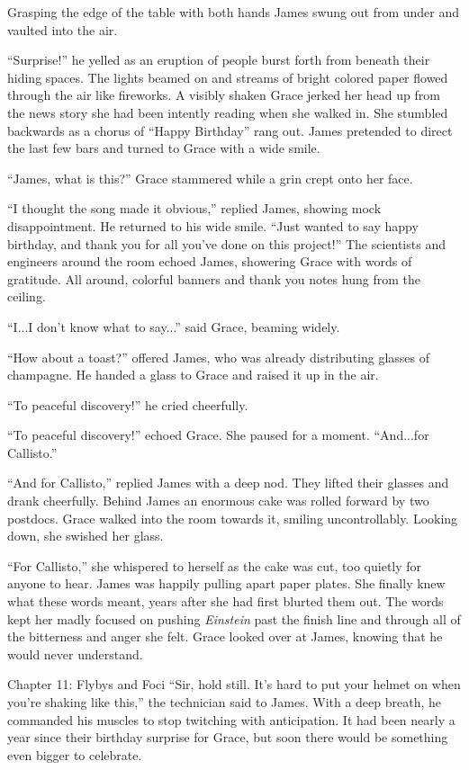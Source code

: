 \documentclass[12pt]{article} %
\begin{document}
Grasping the edge of the table with both hands James swung out from under and vaulted into the air.

``Surprise!'' he yelled as an eruption of people burst forth from beneath their hiding spaces. The lights beamed on and streams of bright colored paper flowed through the air like fireworks. A visibly shaken Grace jerked her head up from the news story she had been intently reading when she walked in. She stumbled backwards as a chorus of ``Happy Birthday'' rang out. James pretended to direct the last few bars and turned to Grace with a wide smile.

``James, what is this?'' Grace stammered while a grin crept onto her face.

``I thought the song made it obvious,'' replied James, showing mock disappointment. He returned to his wide smile. ``Just wanted to say happy birthday, and thank you for all you've done on this project!'' The scientists and engineers around the room echoed James, showering Grace with words of gratitude. All around, colorful banners and thank you notes hung from the ceiling.

``I...I don't know what to say...'' said Grace, beaming widely.

``How about a toast?'' offered James, who was already distributing glasses of champagne. He handed a glass to Grace and raised it up in the air.

``To peaceful discovery!'' he cried cheerfully.

``To peaceful discovery!'' echoed Grace. She paused for a moment. ``And...for Callisto.''

``And for Callisto,'' replied James with a deep nod. They lifted their glasses and drank cheerfully. Behind James an enormous cake was rolled forward by two postdocs. Grace walked into the room towards it, smiling uncontrollably. Looking down, she swished her glass.

``For Callisto,'' she whispered to herself as the cake was cut, too quietly for anyone to hear. James was happily pulling apart paper plates. She finally knew what these words meant, years after she had first blurted them out. The words kept her madly focused on pushing \textit{Einstein} past the finish line and through all of the bitterness and anger she felt. Grace looked over at James, knowing that he would never understand.

Chapter 11: Flybys and Foci
``Sir, hold still. It's hard to put your helmet on when you're shaking like this,'' the technician said to James. With a deep breath, he commanded his muscles to stop twitching with anticipation. It had been nearly a year since their birthday surprise for Grace, but soon there would be something even bigger to celebrate.
\end{document}
